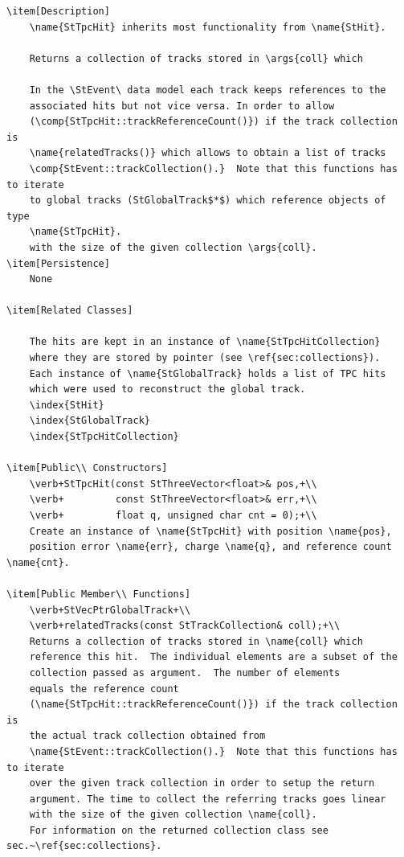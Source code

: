 \begin{Entry}
\begin{Entry}
{\begin{verbatim}
\item[Description]
    \name{StTpcHit} inherits most functionality from \name{StHit}.
    
    Returns a collection of tracks stored in \args{coll} which

    In the \StEvent\ data model each track keeps references to the
    associated hits but not vice versa. In order to allow
    (\comp{StTpcHit::trackReferenceCount()}) if the track collection is
    \name{relatedTracks()} which allows to obtain a list of tracks
    \comp{StEvent::trackCollection().}  Note that this functions has to iterate
    to global tracks (StGlobalTrack$*$) which reference objects of type
    \name{StTpcHit}.
    with the size of the given collection \args{coll}.
\item[Persistence]
    None

\item[Related Classes]
    
    The hits are kept in an instance of \name{StTpcHitCollection}
    where they are stored by pointer (see \ref{sec:collections}).
    Each instance of \name{StGlobalTrack} holds a list of TPC hits
    which were used to reconstruct the global track.
    \index{StHit}
    \index{StGlobalTrack}
    \index{StTpcHitCollection}

\item[Public\\ Constructors]
    \verb+StTpcHit(const StThreeVector<float>& pos,+\\
    \verb+         const StThreeVector<float>& err,+\\
    \verb+         float q, unsigned char cnt = 0);+\\
    Create an instance of \name{StTpcHit} with position \name{pos},
    position error \name{err}, charge \name{q}, and reference count \name{cnt}.

\item[Public Member\\ Functions]
    \verb+StVecPtrGlobalTrack+\\
    \verb+relatedTracks(const StTrackCollection& coll);+\\
    Returns a collection of tracks stored in \name{coll} which
    reference this hit.  The individual elements are a subset of the
    collection passed as argument.  The number of elements
    equals the reference count
    (\name{StTpcHit::trackReferenceCount()}) if the track collection is
    the actual track collection obtained from
    \name{StEvent::trackCollection().}  Note that this functions has to iterate
    over the given track collection in order to setup the return
    argument. The time to collect the referring tracks goes linear
    with the size of the given collection \name{coll}.
    For information on the returned collection class see sec.~\ref{sec:collections}.


\end{verbatim}}
\end{Entry}
\end{Entry}
